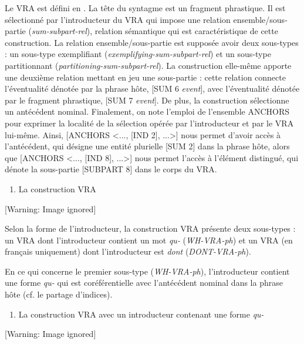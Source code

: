 Le VRA est défini en . La tête du syntagme est un fragment phrastique. Il est sélectionné par l'introducteur du VRA qui impose une relation ensemble/sous-partie (\textit{sum-subpart-rel}), relation sémantique qui est caractéristique de cette construction. La relation ensemble/sous-partie est supposée avoir deux sous-types : un sous-type exemplifiant (\textit{exemplifying-sum-subpart-rel}) et un sous-type partitionnant (\textit{partitioning-sum-subpart-rel}). La construction elle-même apporte une deuxième relation mettant en jeu une sous-partie : cette relation connecte l'éventualité dénotée par la phrase hôte, [SUM 6 \textit{event}],  avec l'éventualité dénotée par le fragment phrastique, [SUM 7 \textit{event}]. De plus, la construction sélectionne un antécédent nominal. Finalement, on note l'emploi de l'ensemble ANCHORS pour exprimer la localité de la sélection opérée par l'introducteur et par le VRA lui-même. Ainsi, [ANCHORS {\textless}..., [IND 2], ...{\textgreater}] nous permet d'avoir accès à l'antécédent, qui désigne une entité plurielle [SUM 2] dans la phrase hôte, alors que [ANCHORS {\textless}..., [IND 8], ...{\textgreater}] nous permet l'accès à l'élément distingué, qui dénote la sous-partie [SUBPART 8] dans le corps du VRA. 


\begin{enumerate}
\item \label{bkm:Ref296099845}La construction VRA  


\end{enumerate}
  [Warning: Image ignored] %
 

Selon la forme de l'introducteur, la construction VRA présente deux sous-types : un VRA dont l'introducteur contient un mot \textit{qu-} (\textit{WH-VRA-ph}) et un VRA (en français uniquement) dont l'introducteur est \textit{dont} (\textit{DONT-VRA-ph}).

En ce qui concerne le premier sous-type (\textit{WH-VRA-ph}), l'introducteur contient une forme \textit{qu-} qui est coréférentielle avec l'antécédent nominal dans la phrase hôte (cf. le partage d'indices).


\begin{enumerate}
\item La construction VRA avec un introducteur contenant une forme \textit{qu-}


\end{enumerate}
  [Warning: Image ignored] %
 

